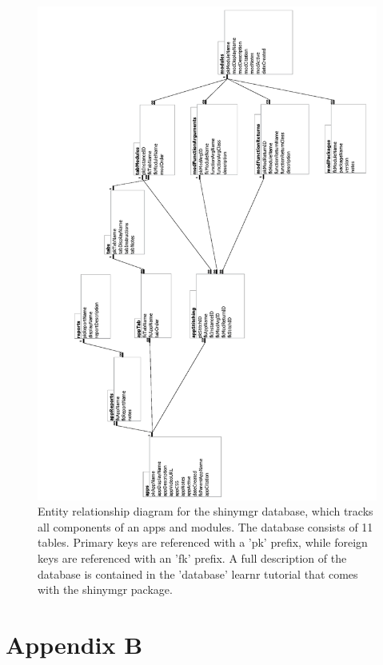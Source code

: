 \begin{figure}[h]
\includegraphics[width=0.85\linewidth]{images/figure8} \caption{Entity relationship diagram for the shinymgr database, which tracks all components of an apps and modules.  The database consists of 11 tables. Primary keys are referenced with a 'pk' prefix, while foreign keys are referenced with an 'fk' prefix. A full description of the database is contained in the 'database' learnr tutorial that comes with the shinymgr package.}\label{fig:fig8}
\end{figure}

\newpage

\section{Appendix B}\label{appendix-b}

